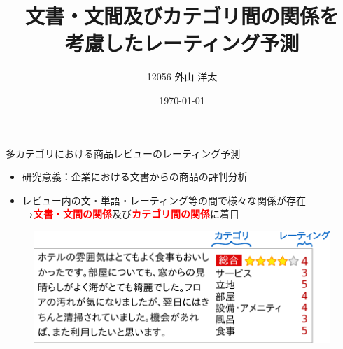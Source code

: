\documentclass[aspectratio=43,unicode,10pt]{beamer}
\title{文書・文間及びカテゴリ間の関係を\\考慮したレーティング予測}
\institute{知能数理研究室}
\author{12056 外山 洋太}
\date{\today}
\newcommand{\fire}[1]{\textcolor{red}{\textbf{#1}}}
\newcommand{\arrow}{\textcolor{ttiblue}{\textbf{→}}\hspace{1ex}}
\begin{document}
\begin{frame}
\titlepage
\end{frame}

\begin{frame}{多カテゴリにおける商品レビューのレーティング予測}{}
  \begin{itemize}
    \item 研究意義：企業における文書からの商品の評判分析
    \item レビュー内の文・単語・レーティング等の間で様々な関係が存在 \\
          \arrow \fire{文書・文間の関係}及び\fire{カテゴリ間の関係}に着目
  \end{itemize}
  \begin{figure}
    \includegraphics[width=0.9\linewidth]{fig/review.pdf}
  \end{figure}
\end{frame}
\end{document}

